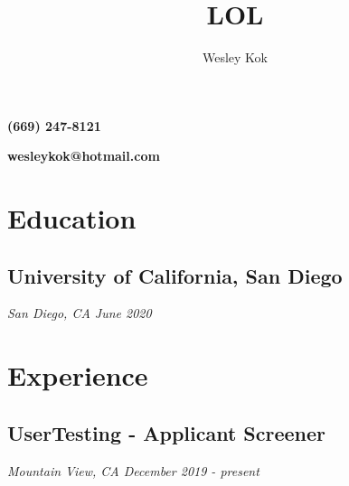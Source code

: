 \documentclass{article}
\makeatletter
\renewcommand{\maketitle}{

{\noindent\huge\bf\theauthor} 

\vspace{-1em}\hfill\large\bf (669) 247-8121

{\noindent \Huge \href{https://github.com/WKhiro}{\faGithub} \href{https://www.linkedin.com/in/wesley-kok/}{\faLinkedin}}

\vspace{-1.5em} \hfill \large \bf wesleykok@hotmail.com

}
\makeatother
\begin{document}
\title{LOL}
\author{Wesley Kok}

\maketitle

\section{Education}
\subsection{University of California, San Diego} \it \quad San Diego, CA \hfill June 2020

\section{Experience}
\subsection{UserTesting - Applicant Screener} \it \quad Mountain View, CA \hfill December 2019 - present
\end{document}
